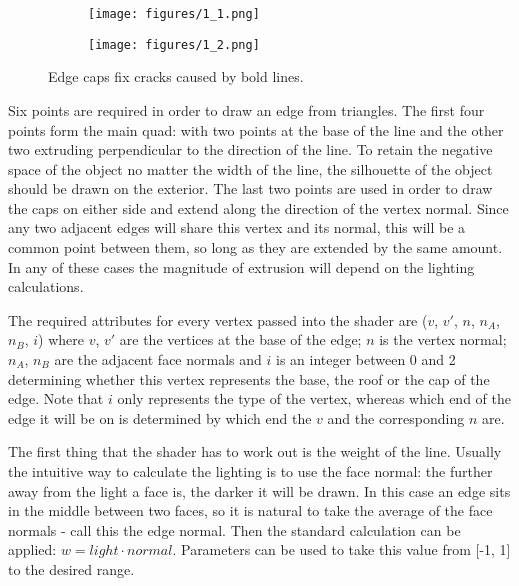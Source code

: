 \documentclass[a4paper, 12pt]{article}
\begin{document}
\begin{figure}
  \centering
  \begin{subfigure}{0.2\columnwidth}
    \texttt{[image: figures/1\_1.png]}
  \end{subfigure}
  \begin{subfigure}{0.2\columnwidth}
    \texttt{[image: figures/1\_2.png]}
  \end{subfigure}
  \caption{Edge caps fix cracks caused by bold lines.}
\end{figure}

Six points are required in order to draw an edge from triangles. The first four points form the main quad: with two points at the base of the line and the other two extruding perpendicular to the direction of the line. To retain the negative space of the object no matter the width of the line, the silhouette of the object should be drawn on the exterior. The last two points are used in order to draw the caps on either side and extend along the direction of the vertex normal. Since any two adjacent edges will share this vertex and its normal, this will be a common point between them, so long as they are extended by the same amount. In any of these cases the magnitude of extrusion will depend on the lighting calculations.

The required attributes for every vertex passed into the shader are ($v$, $v'$, $n$, $n_A$, $n_B$, $i$) where $v$, $v'$ are the vertices at the base of the edge; $n$ is the vertex normal; $n_A$, $n_B$ are the adjacent face normals and $i$ is an integer between 0 and 2 determining whether this vertex represents the base, the roof or the cap of the edge. Note that $i$ only represents the type of the vertex, whereas which end of the edge it will be on is determined by which end the $v$ and the corresponding $n$ are.

The first thing that the shader has to work out is the weight of the line. Usually the intuitive way to calculate the lighting is to use the face normal: the further away from the light a face is, the darker it will be drawn. In this case an edge sits in the middle between two faces, so it is natural to take the average of the face normals - call this the edge normal. Then the standard calculation can be applied: $w = light \cdot normal$. Parameters can be used to take this value from [-1, 1] to the desired range.
\end{document}

